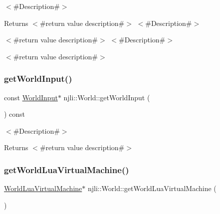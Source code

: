 $<$\#\+Description\#$>$

\begin{DoxyReturn}{Returns}
$<$\#return value description\#$>$ $<$\#\+Description\#$>$

$<$\#return value description\#$>$ $<$\#\+Description\#$>$

$<$\#return value description\#$>$ 
\end{DoxyReturn}
\mbox{\label{classnjli_1_1_world_aefbda7b9bf38ace818503473814d8b18}} 
\subsubsection{\texorpdfstring{get\+World\+Input()}{getWorldInput()}\hspace{0.1cm}{\footnotesize\ttfamily [2/2]}}
{\footnotesize\ttfamily const \mbox{\hyperlink{classnjli_1_1_world_input}{World\+Input}}$\ast$ njli\+::\+World\+::get\+World\+Input (\begin{DoxyParamCaption}{ }\end{DoxyParamCaption}) const}

$<$\#\+Description\#$>$

\begin{DoxyReturn}{Returns}
$<$\#return value description\#$>$ 
\end{DoxyReturn}
\mbox{\label{classnjli_1_1_world_a6ebccef746ad4e44455bae7698839e29}} 
\subsubsection{\texorpdfstring{get\+World\+Lua\+Virtual\+Machine()}{getWorldLuaVirtualMachine()}\hspace{0.1cm}{\footnotesize\ttfamily [1/2]}}
{\footnotesize\ttfamily \mbox{\hyperlink{classnjli_1_1_world_lua_virtual_machine}{World\+Lua\+Virtual\+Machine}}$\ast$ njli\+::\+World\+::get\+World\+Lua\+Virtual\+Machine (\begin{DoxyParamCaption}{ }\end{DoxyParamCaption})}

